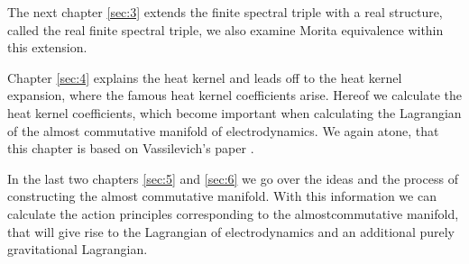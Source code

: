 The next chapter \ref{sec:3} extends the finite spectral triple with a real
structure, called the real finite spectral triple, we also examine Morita
equivalence within this extension.

Chapter \ref{sec:4} explains the heat kernel and leads off to the heat kernel
expansion, where the famous heat kernel coefficients arise. Hereof we
calculate the heat kernel coefficients, which become important when
calculating the Lagrangian of the almost commutative manifold of
electrodynamics. We again atone, that this chapter is based on Vassilevich's
paper \cite{heatkernel}.

In the last two chapters \ref{sec:5} and \ref{sec:6} we go over the ideas and
the process of constructing the almost commutative manifold. With this
information we can calculate the action principles corresponding to the
almostcommutative manifold, that will give rise to the Lagrangian of
electrodynamics and an additional purely gravitational Lagrangian.
